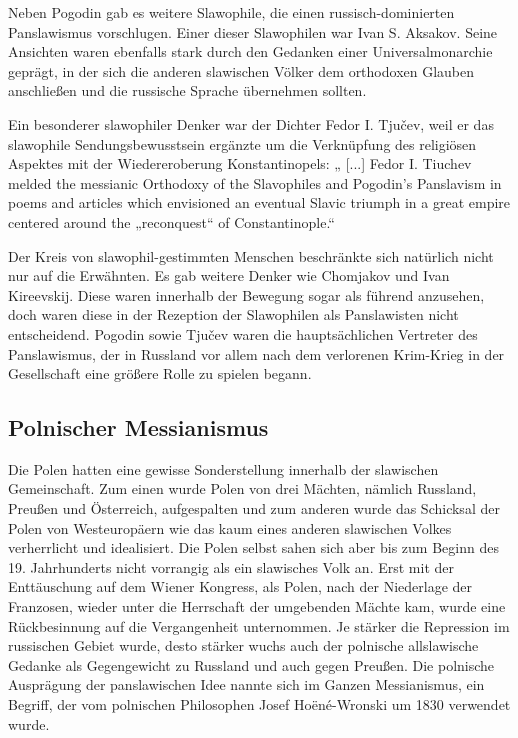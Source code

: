 \documentclass[12pt,headsepline,a4paper]{scrartcl}
\begin{document}
Neben Pogodin gab es weitere Slawophile, die einen russisch-dominierten Panslawismus
vorschlugen. Einer dieser Slawophilen war Ivan S. Aksakov. Seine Ansichten waren ebenfalls
stark durch den Gedanken einer Universalmonarchie geprägt, in der sich die anderen
slawischen Völker dem orthodoxen Glauben anschließen und die russische Sprache
übernehmen sollten.\autocite[232]{nicoll}

Ein besonderer slawophiler Denker war der Dichter Fedor I. Tjučev, weil er das slawophile
Sendungsbewusstsein ergänzte um die Verknüpfung des religiösen Aspektes mit der
Wiedereroberung Konstantinopels: „ [...] Fedor I. Tiuchev melded the messianic Orthodoxy
of the Slavophiles and Pogodin's Panslavism in poems and articles which envisioned an
eventual Slavic triumph in a great empire centered around the „reconquest“ of
Constantinople.“\autocite[232]{nicoll}

Der Kreis von slawophil-gestimmten Menschen beschränkte sich natürlich nicht nur auf die
Erwähnten. Es gab weitere Denker wie Chomjakov und Ivan Kireevskij. Diese waren
innerhalb der Bewegung sogar als führend anzusehen\autocite[132]{kohn}, doch waren
diese in der Rezeption der Slawophilen als Panslawisten nicht entscheidend. Pogodin sowie
Tjučev waren die hauptsächlichen Vertreter des Panslawismus, der in Russland vor allem
nach dem verlorenen Krim-Krieg in der Gesellschaft eine größere Rolle zu spielen begann.

\subsection{Polnischer Messianismus}
Die Polen hatten eine gewisse Sonderstellung innerhalb der slawischen Gemeinschaft. Zum
einen wurde  Polen von drei Mächten, nämlich Russland,
Preußen und Österreich, aufgespalten und zum anderen wurde das Schicksal der Polen von
Westeuropäern wie das kaum eines anderen slawischen Volkes verherrlicht und idealisiert.
Die Polen selbst sahen sich aber bis zum Beginn des 19. Jahrhunderts nicht vorrangig als ein
slawisches Volk an. Erst mit der Enttäuschung auf dem Wiener Kongress, als Polen, nach der
Niederlage der Franzosen, wieder unter die Herrschaft der umgebenden Mächte kam, wurde
eine Rückbesinnung auf die Vergangenheit unternommen. Je stärker die Repression im
russischen Gebiet wurde, desto stärker wuchs auch der polnische allslawische Gedanke als
Gegengewicht zu Russland und auch gegen Preußen.\autocite[252]{falkovic} Die polnische
Ausprägung der panslawischen Idee nannte sich im Ganzen Messianismus, ein Begriff, der
vom polnischen Philosophen Josef Hoëné-Wronski um 1830 verwendet wurde.
\end{document}
